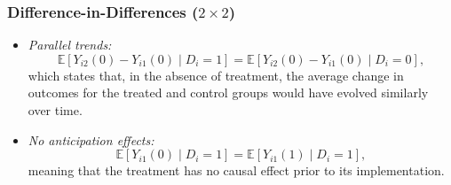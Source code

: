 \documentclass[12pt, compress]{beamer}
\begin{document}
\begin{frame}
	\frametitle{Difference-in-Differences ($2 \times 2$)}
    \begin{itemize}
        \item \textit{Parallel trends:}
\begin{equation*}
	\mathbb{E}[Y_{i2}(0) - Y_{i1}(0) \mid D_i = 1] = \mathbb{E}[Y_{i2}(0) - Y_{i1}(0) \mid D_i = 0],
\end{equation*}
which states that, in the absence of treatment, the average change in outcomes for the treated and control groups would have evolved similarly over time.

\item \textit{No anticipation effects:}
\begin{equation*}
	\mathbb{E}[Y_{i1}(0)\mid D_i=1] = \mathbb{E}[Y_{i1}(1)\mid D_i=1],
\end{equation*}
meaning that the treatment has no causal effect prior to its implementation.
    \end{itemize}
\end{frame}
\end{document}
